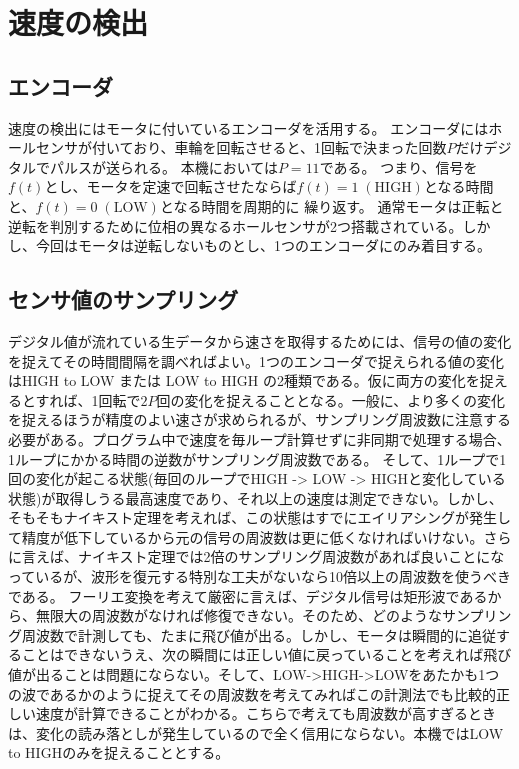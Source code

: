 \documentclass{ltjsreport}
\begin{document}
\section{速度の検出}
\subsection{エンコーダ}
速度の検出にはモータに付いているエンコーダを活用する。
エンコーダにはホールセンサが付いており、車輪を回転させると、1回転で決まった回数$P$だけデジタルでパルスが送られる。
本機においては$P=11$である。
つまり、信号を$f(t)$とし、モータを定速で回転させたならば$f(t)=1 \; \mathrm{(HIGH)}$となる時間と、$f(t)=0 \; \mathrm{(LOW)}$となる時間を周期的に
繰り返す。
通常モータは正転と逆転を判別するために位相の異なるホールセンサが2つ搭載されている。しかし、今回はモータは逆転しないものとし、1つのエンコーダにのみ着目する。

\subsection{センサ値のサンプリング}
デジタル値が流れている生データから速さを取得するためには、信号の値の変化を捉えてその時間間隔を調べればよい。1つのエンコーダで捉えられる値の変化はHIGH to LOW または LOW to HIGH の2種類である。仮に両方の変化を捉えるとすれば、1回転で$2P$回の変化を捉えることとなる。一般に、より多くの変化を捉えるほうが精度のよい速さが求められるが、サンプリング周波数に注意する必要がある。プログラム中で速度を毎ループ計算せずに非同期で処理する場合、1ループにかかる時間の逆数がサンプリング周波数である。
そして、1ループで1回の変化が起こる状態(毎回のループでHIGH -> LOW -> HIGHと変化している状態)が取得しうる最高速度であり、それ以上の速度は測定できない。しかし、そもそもナイキスト定理を考えれば、この状態はすでにエイリアシングが発生して精度が低下しているから元の信号の周波数は更に低くなければいけない。さらに言えば、ナイキスト定理では2倍のサンプリング周波数があれば良いことになっているが、波形を復元する特別な工夫がないなら10倍以上の周波数を使うべきである。
フーリエ変換を考えて厳密に言えば、デジタル信号は矩形波であるから、無限大の周波数がなければ修復できない。そのため、どのようなサンプリング周波数で計測しても、たまに飛び値が出る。しかし、モータは瞬間的に追従することはできないうえ、次の瞬間には正しい値に戻っていることを考えれば飛び値が出ることは問題にならない。そして、LOW->HIGH->LOWをあたかも1つの波であるかのように捉えてその周波数を考えてみればこの計測法でも比較的正しい速度が計算できることがわかる。こちらで考えても周波数が高すぎるときは、変化の読み落としが発生しているので全く信用にならない。本機ではLOW to HIGHのみを捉えることとする。
\end{document}
